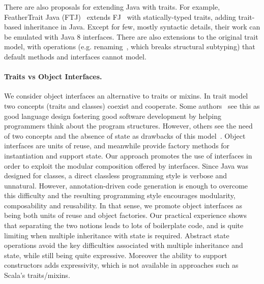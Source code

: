 There are also proposals for extending Java with traits. For
example, FeatherTrait Java (FTJ)~\cite{Liquori08ftj} extends
FJ~\cite{Igarashi01FJ} with statically-typed traits, adding trait-based
inheritance in Java.  Except for few, mostly syntactic details, their work can
be emulated with Java 8 interfaces. There are also extensions to the original
trait model, with operations (e.g. renaming~\cite{reppy2006foundation}, which breaks
structural subtyping) that default methods and interfaces cannot
model.

\paragraph{Traits vs Object Interfaces.}
We consider object interfaces an alternative to traits or mixins. In 
trait model two concepts (traits and classes) coexist and cooperate. Some
authors~\cite{BettiniDSS13} see this as good language design fostering good
software development by helping programmers think about the program structures. 
However, others see the need of two concepts and the
absence of state as drawbacks of this model~\cite{malayeri2009cz}.  Object
interfaces are units of reuse, and meanwhile provide factory methods
for instantiation and support state. Our approach promotes the use of
interfaces in order to exploit the modular composition
offered by interfaces. Since Java was designed for classes, a direct classless
programming style is verbose and unnatural. However, annotation-driven code
generation is enough to overcome this difficulty and the resulting programming
style encourages modularity, composability and reusability. %
In that sense, we promote object interfaces as being both units of
reuse and object factories. Our practical experience shows that 
separating the two notions leads to lots of boilerplate code, and is quite
limiting when multiple inheritance with state is required.  Abstract state
operations avoid the key difficulties associated with multiple inheritance and
state, while still being quite expressive. Moreover the ability to support
constructors adds expressivity, which is not available in approaches
such as Scala's traits/mixins.


